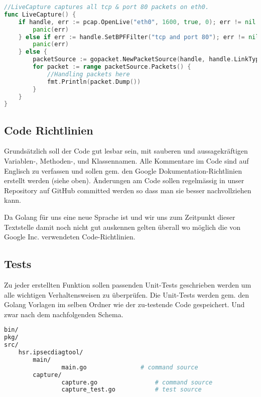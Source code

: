 \begin{lstlisting}[language=go]
//LiveCapture captures all tcp & port 80 packets on eth0.
func LiveCapture() {
	if handle, err := pcap.OpenLive("eth0", 1600, true, 0); err != nil {
		panic(err)
	} else if err := handle.SetBPFFilter("tcp and port 80"); err != nil {
		panic(err)
	} else {
		packetSource := gopacket.NewPacketSource(handle, handle.LinkType())
		for packet := range packetSource.Packets() {
			//Handling packets here
			fmt.Println(packet.Dump())
		}
	}
}
\end{lstlisting}


\subsection{Code Richtlinien}
Grundsätzlich soll der Code gut lesbar sein, mit sauberen und aussagekräftigen Variablen-, Methoden-, und Klassennamen. Alle Kommentare im Code sind auf Englisch zu verfassen und sollen gem. den Google Dokumentation-Richtlinien erstellt werden (siehe oben).
Änderungen am Code sollen regelmässig in unser Repository auf GitHub committed werden so dass man sie besser nachvollziehen kann.

Da Golang für uns eine neue Sprache ist und wir uns zum Zeitpunkt dieser Textstelle damit noch nicht gut auskennen gelten überall wo möglich die von Google Inc. verwendeten Code-Richtlinien.


\subsection{Tests}
Zu jeder erstellten Funktion sollen passenden Unit-Tests geschrieben werden um alle wichtigen Verhaltensweisen zu überprüfen. Die Unit-Tests werden gem. den Golang Vorlagen im selben Ordner wie der zu-testende Code gespeichert. Und zwar nach dem nachfolgenden Schema.

\begin{lstlisting}[language=bash]
bin/
pkg/
src/
    hsr.ipsecdiagtool/
		main/
	    		main.go               # command source
		capture/
	    		capture.go                # command source
	    		capture_test.go           # test source
\end{lstlisting}
